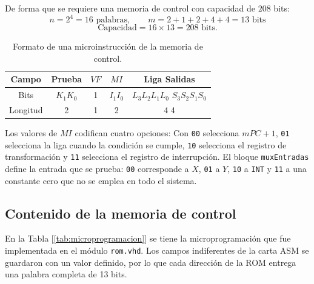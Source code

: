 \documentclass[letterpaper,12pt]{article}
\begin{document}
De forma que se requiere una memoria de control con capacidad de $208$ bits:
\[
n=2^4=16 \text{ palabras}, \qquad
m=2+1+2+4+4=13 \text{ bits}
\]
\[
\text{Capacidad}=16 \times 13=\boxed{208\text{ bits}}.
\]

\begin{table}[H]
\centering
\caption{Formato de una microinstrucción de la memoria de control.}
\label{tab:formato-micro}
\begin{tabular}{c c c c c}
\toprule
Campo & Prueba & $VF$ & $MI$ & Liga \hspace{5mm} Salidas \\
\midrule
Bits & $K_1K_0$ & 1 & $I_1I_0$ & $L_3L_2L_1L_0$ \hspace{3mm} $S_3S_2S_1S_0$ \\
Longitud & 2 & 1 & 2 & 4 \hspace{12mm} 4 \\
\bottomrule
\end{tabular}
\end{table}

Los valores de $MI$ codifican cuatro opciones: Con \texttt{00} selecciona $mPC+1$, \texttt{01} selecciona la liga cuando la condición se cumple, \texttt{10} selecciona el registro de transformación y \texttt{11} selecciona el registro de interrupción. El bloque \texttt{muxEntradas} define la entrada que se prueba: \texttt{00} corresponde a $X$, \texttt{01} a $Y$, \texttt{10} a \texttt{INT} y \texttt{11} a una constante cero que no se emplea en todo el sistema.

\subsection{Contenido de la memoria de control}

En la Tabla [\ref{tab:microprogramacion}] se tiene la microprogramación que fue implementada en el módulo \texttt{rom.vhd}. Los campos indiferentes de la carta ASM se guardaron con un valor definido, por lo que cada dirección de la ROM entrega una palabra completa de 13 bits.
\end{document}
